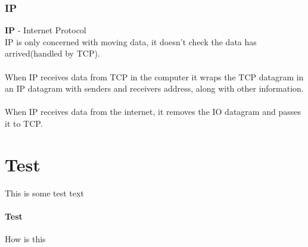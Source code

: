 \documentclass{article}[18pt]
\begin{document}
\subsubsection{IP}
\textbf{IP} - Internet Protocol\\
IP is only concerned with moving data, it doesn't check the data has arrived(handled by TCP).\\
\\
When IP receives data from TCP in the computer it wraps the TCP datagram in an IP datagram with senders and receivers address, along with other information.\\
\\
When IP receives data from the internet, it removes the IO datagram and passes it to TCP.
\section{Test}
This is some test text
\paragraph{Test}
How is this
\end{document}
